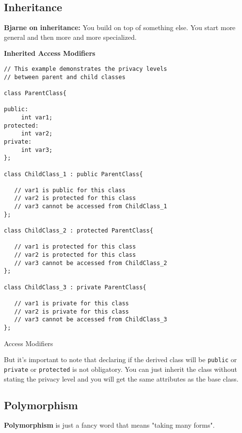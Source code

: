 \documentclass[11pt, a4paper]{article}
\begin{document}
\subsection{Inheritance}%
\label{sub:inheritance}

\textbf{Bjarne on inheritance:} You build on top of something else. You start more general and then more and more specialized. 


\textbf{Inherited Access Modifiers}

\begin{listing}[hbt!]
\begin{verbatim}
// This example demonstrates the privacy levels
// between parent and child classes

class ParentClass{

public:
     int var1;
protected:
     int var2;
private:
     int var3;
};

class ChildClass_1 : public ParentClass{

   // var1 is public for this class
   // var2 is protected for this class
   // var3 cannot be accessed from ChildClass_1
};

class ChildClass_2 : protected ParentClass{

   // var1 is protected for this class
   // var2 is protected for this class
   // var3 cannot be accessed from ChildClass_2
};

class ChildClass_3 : private ParentClass{

   // var1 is private for this class
   // var2 is private for this class
   // var3 cannot be accessed from ChildClass_3
};
\end{verbatim}
\caption{Access Modifiers}
\label{lst:access_modifiers}
\end{listing}

But it's important to note that declaring if the derived class will be \texttt{public} or \texttt{private} or \texttt{protected} is not obligatory. You can just inherit the class without stating the privacy level and you will get the same attributes as the base class.



\subsection{Polymorphism}%
\label{sub:polymorphism}

\textbf{Polymorphism} is just a fancy word that means "taking many forms".
\end{document}
